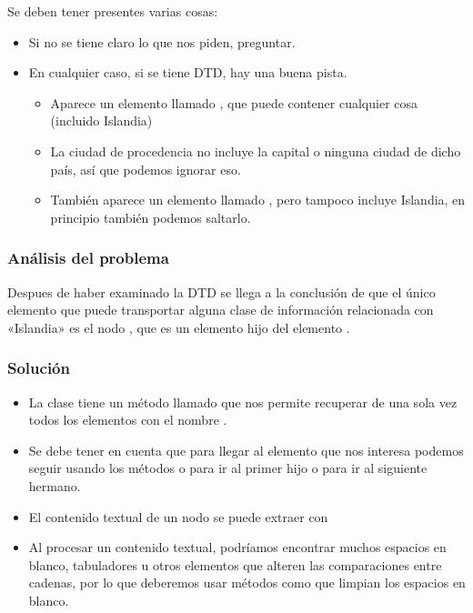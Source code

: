 \documentclass[letterpaper,10pt,spanish]{sphinxmanual}
\begin{document}
Se deben tener presentes varias cosas:
\begin{itemize}
\item {} 
Si no se tiene claro lo que nos piden, preguntar.

\item {} 
En cualquier caso, si se tiene DTD, hay una buena pista.
\begin{itemize}
\item {} 
Aparece un elemento llamado , que puede contener cualquier cosa (incluido Islandia)

\item {} 
La ciudad de procedencia no incluye la capital o ninguna ciudad de dicho país, así que podemos ignorar eso.

\item {} 
También aparece un elemento llamado , pero tampoco incluye Islandia, en principio también podemos saltarlo.

\end{itemize}

\end{itemize}


\subsubsection{Análisis del problema}
\label{\detokenize{tema6:analisis-del-problema}}
Despues de haber examinado la DTD se llega a la conclusión de que el único elemento que puede transportar alguna clase de información relacionada con «Islandia» es el nodo , que es un elemento hijo del elemento .


\subsubsection{Solución}
\label{\detokenize{tema6:solucion}}\begin{itemize}
\item {} 
La clase  tiene un método llamado  que nos permite recuperar de una sola vez todos los elementos con el nombre .

\item {} 
Se debe tener en cuenta que para llegar al elemento que nos interesa podemos seguir usando los métodos  o  para ir al primer hijo o para ir al siguiente hermano.

\item {} 
El contenido textual de un nodo se puede extraer con 

\item {} 
Al procesar un contenido textual, podríamos encontrar muchos espacios en blanco, tabuladores u otros elementos que alteren las comparaciones entre cadenas, por lo que deberemos usar métodos como  que limpian los espacios en blanco.

\end{itemize}
\end{document}
